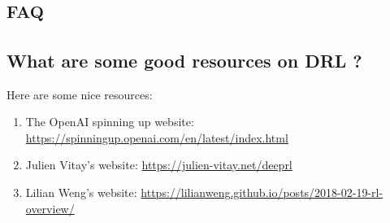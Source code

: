 \chapter{\textsc{faq}}

\section{What are some good resources on DRL ?}

Here are some nice resources:

\begin{enumerate}
	\item The OpenAI spinning up website: \url{https://spinningup.openai.com/en/latest/index.html}
	\item Julien Vitay's website: \url{https://julien-vitay.net/deeprl}
	\item Lilian Weng's website: \url{https://lilianweng.github.io/posts/2018-02-19-rl-overview/}
\end{enumerate}
